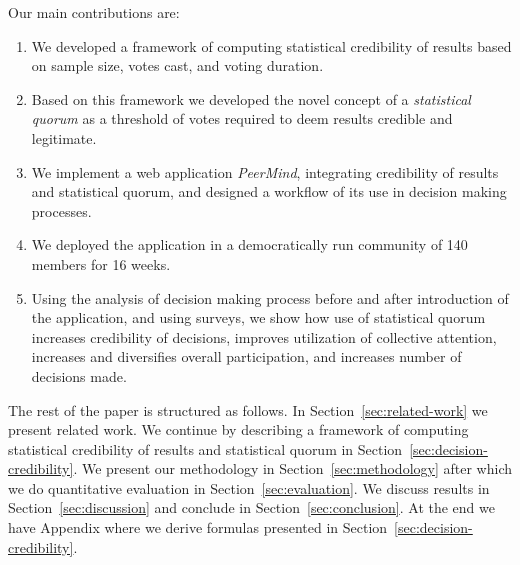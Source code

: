 \documentclass[format=acmsmall, review=true, screen=true, anonymous=true]{acmart}
\begin{document}

Our main contributions are:

\begin{enumerate}
\item We developed a framework of computing statistical credibility of results
based on sample size, votes cast, and voting duration.
\item Based on this framework we developed the novel concept of a \emph{statistical quorum} as a threshold of votes required to deem results credible and legitimate.
\item We implement a web application \emph{PeerMind},
integrating credibility of results and statistical quorum, and designed
a workflow of its use in decision making processes.
\item We deployed the application in a democratically run community of 140
members for 16 weeks.
\item Using the analysis of decision making process before and after introduction
of the application, and using surveys,
we show
how use of statistical quorum increases credibility of decisions,
improves utilization of collective attention, increases and diversifies overall participation,
and increases number of decisions made.
\end{enumerate}

The rest of the paper is structured as follows. In Section~\ref{sec:related-work} we
present related work. We continue by describing a framework of computing statistical
credibility of results and statistical quorum in Section~\ref{sec:decision-credibility}.
We present our methodology in Section~\ref{sec:methodology} after which we do
quantitative
evaluation in Section~\ref{sec:evaluation}. We discuss results in
Section~\ref{sec:discussion} and conclude in Section~\ref{sec:conclusion}. At the end we
have Appendix where we derive formulas presented in Section~\ref{sec:decision-credibility}.
\end{document}
